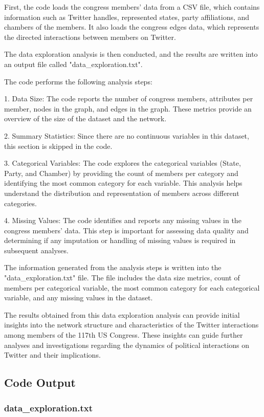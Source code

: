 \documentclass[11pt]{article}
\begin{document}
First, the code loads the congress members' data from a CSV file, which contains information such as Twitter handles, represented states, party affiliations, and chambers of the members. It also loads the congress edges data, which represents the directed interactions between members on Twitter.

The data exploration analysis is then conducted, and the results are written into an output file called "data\_exploration.txt".

The code performs the following analysis steps:

1. Data Size: The code reports the number of congress members, attributes per member, nodes in the graph, and edges in the graph. These metrics provide an overview of the size of the dataset and the network.

2. Summary Statistics: Since there are no continuous variables in this dataset, this section is skipped in the code.

3. Categorical Variables: The code explores the categorical variables (State, Party, and Chamber) by providing the count of members per category and identifying the most common category for each variable. This analysis helps understand the distribution and representation of members across different categories.

4. Missing Values: The code identifies and reports any missing values in the congress members' data. This step is important for assessing data quality and determining if any imputation or handling of missing values is required in subsequent analyses.

The information generated from the analysis steps is written into the "data\_exploration.txt" file. The file includes the data size metrics, count of members per categorical variable, the most common category for each categorical variable, and any missing values in the dataset.

The results obtained from this data exploration analysis can provide initial insights into the network structure and characteristics of the Twitter interactions among members of the 117th US Congress. These insights can guide further analyses and investigations regarding the dynamics of political interactions on Twitter and their implications.

\subsection{Code Output}

\subsubsection*{data\_exploration.txt}
\end{document}
